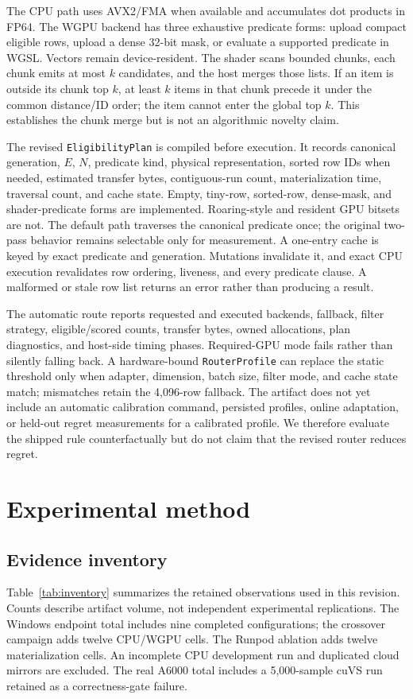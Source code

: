 \documentclass[10pt]{article}
\begin{document}
The CPU path uses AVX2/FMA when available and accumulates dot products in FP64. The WGPU backend has three exhaustive predicate forms: upload compact eligible rows, upload a dense 32-bit mask, or evaluate a supported predicate in WGSL. Vectors remain device-resident. The shader scans bounded chunks, each chunk emits at most \(k\) candidates, and the host merges those lists. If an item is outside its chunk top \(k\), at least \(k\) items in that chunk precede it under the common distance/ID order; the item cannot enter the global top \(k\). This establishes the chunk merge but is not an algorithmic novelty claim.

The revised \texttt{EligibilityPlan} is compiled before execution. It records canonical generation, \(E\), \(N\), predicate kind, physical representation, sorted row IDs when needed, estimated transfer bytes, contiguous-run count, materialization time, traversal count, and cache state. Empty, tiny-row, sorted-row, dense-mask, and shader-predicate forms are implemented. Roaring-style and resident GPU bitsets are not. The default path traverses the canonical predicate once; the original two-pass behavior remains selectable only for measurement. A one-entry cache is keyed by exact predicate and generation. Mutations invalidate it, and exact CPU execution revalidates row ordering, liveness, and every predicate clause. A malformed or stale row list returns an error rather than producing a result.

The automatic route reports requested and executed backends, fallback, filter strategy, eligible/scored counts, transfer bytes, owned allocations, plan diagnostics, and host-side timing phases. Required-GPU mode fails rather than silently falling back. A hardware-bound \texttt{RouterProfile} can replace the static threshold only when adapter, dimension, batch size, filter mode, and cache state match; mismatches retain the 4,096-row fallback. The artifact does not yet include an automatic calibration command, persisted profiles, online adaptation, or held-out regret measurements for a calibrated profile. We therefore evaluate the shipped rule counterfactually but do not claim that the revised router reduces regret.

\section{Experimental method}
\subsection{Evidence inventory}
Table~\ref{tab:inventory} summarizes the retained observations used in this revision. Counts describe artifact volume, not independent experimental replications. The Windows endpoint total includes nine completed configurations; the crossover campaign adds twelve CPU/WGPU cells. The Runpod ablation adds twelve materialization cells. An incomplete CPU development run and duplicated cloud mirrors are excluded. The real A6000 total includes a 5,000-sample cuVS run retained as a correctness-gate failure.
\end{document}
